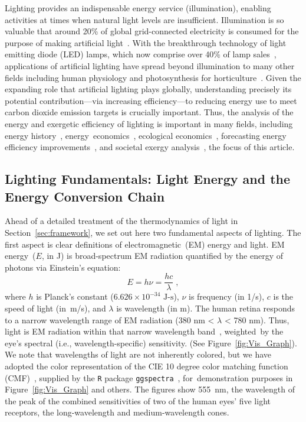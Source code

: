 \documentclass[energies,article,accept,moreauthors,pdftex]{Definitions/mdpi}\usepackage[]{graphicx}\usepackage[]{color}
\newcommand{\ins}[1]{#1}
\newcommand{\humaneyesensitivity}{380 nm < $\lambda$ < 780 nm}
\providecommand{\DIFaddbegin}{} %
\providecommand{\DIFaddend}{} %
\newcommand{\DIFaddincludegraphics}[2][]{{\color{blue}\fbox{\DIFOincludegraphics[#1]{#2}}}} %
\DeclareRobustCommand{\DIFaddbegin}{\DIFOaddbegin \let\includegraphics\DIFaddincludegraphics} %
\DeclareRobustCommand{\DIFaddend}{\DIFOaddend \let\includegraphics\DIFOincludegraphics} %
\begin{document}
Lighting provides an indispensable energy service (illumination), 
enabling activities at times when natural light levels are insufficient.
Illumination is so valuable that around 20\% of global grid-connected electricity 
is consumed for the purpose of making artificial light~\cite{waide2006}.
With the breakthrough technology of light emitting diode (LED) lamps,
which now comprise over 40\% of lamp sales~\cite{IEA2020},
applications of artificial lighting have spread beyond illumination to many other fields
including human physiology and photosynthesis for horticulture~\cite{Pattison2018LEDefficacy}.
Given the expanding role that artificial lighting plays globally,
understanding precisely 
its potential contribution---via increasing efficiency---to reducing energy use
to meet carbon dioxide emission targets is crucially important.
Thus, the analysis of the energy and exergetic efficiency of lighting 
is important in many fields, including
energy history~\cite{Fouquet:2006},
\mbox{energy economics~\cite{Nordhaus1996}},
ecological economics~\cite{whiting2020illumination},
forecasting energy efficiency improvements~\cite{IEA2020}, and 
societal exergy analysis~\cite{Ayres2005},
the focus of this article.


\subsection{Lighting Fundamentals: Light Energy and the Energy Conversion Chain}
\label{sec:light_ECC}

Ahead of a detailed treatment of the thermodynamics of light in Section~\ref{sec:framework}, we set out here two fundamental aspects of lighting. 
The first aspect is clear definitions of electromagnetic~(EM) energy and light.
EM energy~($E$, in J) is broad-spectrum EM radiation
quantified by the energy of photons via Einstein's equation:
\begin{equation}
  E = h \nu = \frac{hc}{\lambda} \; ,
\end{equation}
%
where 
$h$ is Planck's constant ($6.626 \times 10^{-34} \text{ J-s}$), 
$\nu$ is frequency (in 1/s),
$c$ is the speed of light (\mbox{in m/s}), and
$\lambda$ is wavelength (in m).
The human retina responds to a narrow wavelength range of EM radiation
(\humaneyesensitivity{}).
Thus, light is EM radiation within that narrow wavelength band~\cite{campbell2017}, 
\mbox{weighted by} the eye's spectral (i.e., wavelength-specific) sensitivity.
(See Figure~\ref{fig:Vis_Graph}){.}
\DIFaddbegin \ins{We note that wavelengths of light are not inherently colored, 
but we have adopted the color representation
of the CIE 10 degree color matching function (CMF)~\cite{CIE2006},
supplied by the \texttt{R} package \texttt{ggspectra}~\cite{Aphalo2015},
\mbox{for demonstration} purposes
in Figure~\ref{fig:Vis_Graph} 
and others.
The figures show 555~nm, the wavelength of the peak of the combined sensitivities 
of two of the human eyes' five light receptors, 
the long-wavelength and medium-wavelength cones.}%
\DIFaddend 
\end{document}
